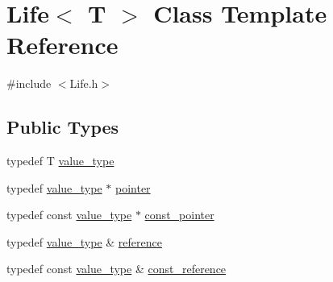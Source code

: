 \hypertarget{classLife}{\section{Life$<$ T $>$ Class Template Reference}
\label{classLife}
}


{\ttfamily \#include $<$Life.\-h$>$}

\subsection*{Public Types}
\begin{DoxyCompactItemize}
\item 
typedef T \hyperlink{classLife_aa51e5c8b3a0acdfa99fc9ea8c2b550f8}{value\-\_\-type}
\item 
typedef \hyperlink{classLife_aa51e5c8b3a0acdfa99fc9ea8c2b550f8}{value\-\_\-type} $\ast$ \hyperlink{classLife_a9fcacd1ed4c7c6c313f94fd4e8437c20}{pointer}
\item 
typedef const \hyperlink{classLife_aa51e5c8b3a0acdfa99fc9ea8c2b550f8}{value\-\_\-type} $\ast$ \hyperlink{classLife_a8e7afcee10dfa80f7a8826be61e79eca}{const\-\_\-pointer}
\item 
typedef \hyperlink{classLife_aa51e5c8b3a0acdfa99fc9ea8c2b550f8}{value\-\_\-type} \& \hyperlink{classLife_ab4d947634b5fb6d355a4a10cd6b0c505}{reference}
\item 
typedef const \hyperlink{classLife_aa51e5c8b3a0acdfa99fc9ea8c2b550f8}{value\-\_\-type} \& \hyperlink{classLife_a2cafb762c1d8dc3d3fc2c820f175b847}{const\-\_\-reference}
\end{DoxyCompactItemize}
